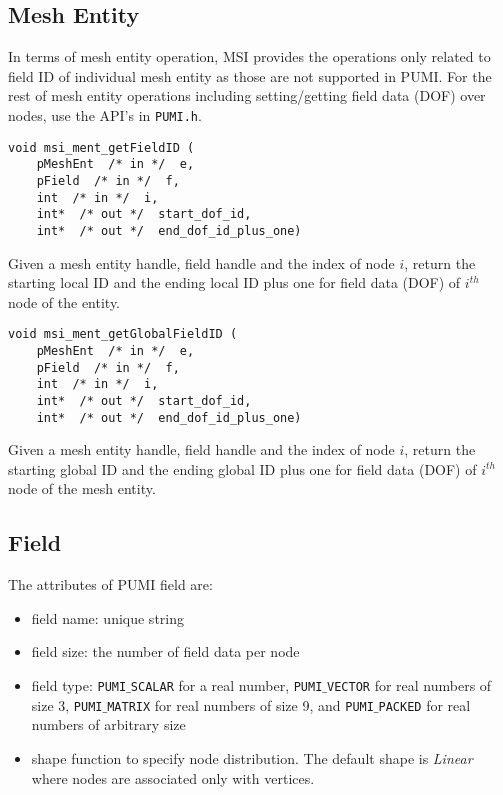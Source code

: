 \subsection{Mesh Entity}
In terms of mesh entity operation, MSI provides the operations only related to field ID of individual mesh entity as those are not supported in PUMI. For the rest of mesh entity operations including setting/getting field data (DOF) over nodes, use the API's in \texttt{PUMI.h}. 


\begin{verbatim}
void msi_ment_getFieldID (
    pMeshEnt  /* in */  e, 
    pField  /* in */  f, 
    int  /* in */  i,
    int*  /* out */  start_dof_id, 
    int*  /* out */  end_dof_id_plus_one)
\end{verbatim}\vspace{-.5cm}\hspace{1cm}
Given a mesh entity handle, field handle and the index of node $i$, return the starting local ID and the ending local ID plus one for field data (DOF) of $i^{th}$ node of the entity. 

\begin{verbatim}
void msi_ment_getGlobalFieldID (
    pMeshEnt  /* in */  e, 
    pField  /* in */  f, 
    int  /* in */  i,
    int*  /* out */  start_dof_id, 
    int*  /* out */  end_dof_id_plus_one)
\end{verbatim}\vspace{-.5cm}\hspace{1cm}
Given a mesh entity handle, field handle and the index of node $i$, return the starting global ID and the ending global ID plus one for field data (DOF) of $i^{th}$ node of the mesh entity. 

\subsection{Field}

The attributes of PUMI field are:
\begin{itemize}
\item field name: unique string 
\item field size: the number of field data per node
\item field type: \texttt{PUMI$\_$SCALAR} for a real number, \texttt{PUMI$\_$VECTOR} for real numbers of size 3, \texttt{PUMI$\_$MATRIX} for real numbers of size 9, and \texttt{PUMI$\_$PACKED} for real numbers of arbitrary size
\item shape function to specify node distribution. The default shape is \textit{Linear} where nodes are associated only with vertices.
\end{itemize}

